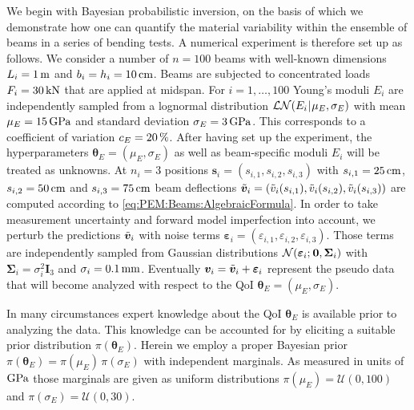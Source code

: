 We begin with Bayesian probabilistic inversion, on the basis of which we demonstrate how one can quantify the material variability within the ensemble of beams in a series of bending tests.
A numerical experiment is therefore set up as follows.
We consider a number of \(n=100\) beams with well-known dimensions \(L_i=\unit[1]{m}\) and \(b_i=h_i=\unit[10]{cm}\).
Beams are subjected to concentrated loads \(F_i=\unit[30]{kN}\) that are applied at midspan.
For \(i=1,\ldots,100\) Young's moduli \(E_i\) are independently sampled from a lognormal distribution \(\mathcal{LN}(E_i {\:\!}|{\:\!} \mu_E,\sigma_E)\) with mean \(\mu_E=\unit[15]{GPa}\) and standard deviation \(\sigma_E=\unit[3]{GPa}\).
This corresponds to a coefficient of variation \(c_{E} = \unit[20]{\%}\).
After having set up the experiment, the hyperparameters \(\bm{\theta}_E=(\mu_E,\sigma_E)\) as well as beam-specific moduli \(E_i\) will be treated as unknowns. 
At \(n_i=3\) positions \(\bm{s}_i = (s_{i,1},s_{i,2},s_{i,3})\) with \(s_{i,1}=\unit[25]{cm}\), \(s_{i,2}=\unit[50]{cm}\) and \(s_{i,3}=\unit[75]{cm}\)
beam deflections \(\tilde{\bm{v}}_i = (\tilde{v}_i(s_{i,1}),\tilde{v}_i(s_{i,2}),\tilde{v}_i(s_{i,3}))\) are computed according to \cref{eq:PEM:Beams:AlgebraicFormula}.
In order to take measurement uncertainty and forward model imperfection into account, we perturb the predictions \(\tilde{\bm{v}}_i\) with noise terms \(\bm{\varepsilon}_i = (\varepsilon_{i,1},\varepsilon_{i,2},\varepsilon_{i,3})\).
Those terms are independently sampled from Gaussian distributions \(\mathcal{N}(\bm{\varepsilon}_i ;{\:\!} \bm{0},\bm{\Sigma}_i)\) with \(\bm{\Sigma}_i = \sigma_i^2 \bm{I}_3\) and \(\sigma_i = \unit[0.1]{mm}\).
Eventually \(\bm{v}_i = \tilde{\bm{v}}_i + \bm{\varepsilon}_i\) represent the pseudo data that will become analyzed with respect to the QoI \(\bm{\theta}_E = (\mu_E,\sigma_E)\).
\par %
In many circumstances expert knowledge about the QoI \(\bm{\theta}_E\) is available prior to analyzing the data.
This knowledge can be accounted for by eliciting a suitable prior distribution \(\pi(\bm{\theta}_E)\).
Herein we employ a proper Bayesian prior \(\pi(\bm{\theta}_E) = \pi(\mu_E) \, \pi(\sigma_E)\) with independent marginals.
As measured in units of \(\unit[]{GPa}\) those marginals are given as uniform distributions \(\pi(\mu_E) = \mathcal{U}(0,100)\) and \(\pi(\sigma_E) = \mathcal{U}(0,30)\).
